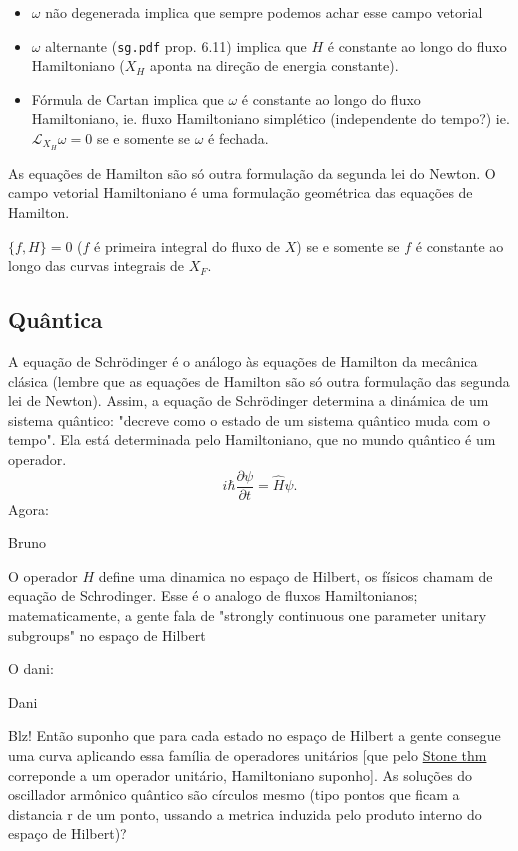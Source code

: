 \begin{itemize}
\item $\omega$ n\~ao degenerada implica que sempre podemos achar esse campo vetorial

\item  $\omega$ alternante (\texttt{sg.pdf} prop. 6.11) implica que $H$ \'e constante ao longo do fluxo Hamiltoniano ($X_H$ aponta na  dire\c c\~ao de energia constante).

\item F\'ormula de Cartan implica que $\omega$  \'e constante ao longo do fluxo Hamiltoniano, ie. fluxo Hamiltoniano simpl\'etico (independente do tempo?) ie. $\mathcal{L}_{X_H}\omega=0$ se e somente se $\omega$ \'e fechada.
\end{itemize}

As equa\c c\~oes de Hamilton s\~ao s\'o outra formula\c c\~ao da segunda lei do Newton. O campo vetorial Hamiltoniano \'e uma formula\c c\~ao geom\'etrica das equa\c c\~oes de Hamilton.

\begin{prop}
	$\{f,H\}=0$ ($f$ \'e primeira integral do fluxo de $X$) se e somente se $f$ \'e constante ao longo das curvas integrais de $X_F$.
\end{prop}

\subsection{Qu\^antica}

A equação de Schrödinger é o análogo às equações de Hamilton da mecânica clásica (lembre que as equações de Hamilton são só outra formulação das segunda lei de Newton). Assim, a equação de Schrödinger determina a dinámica de um sistema quântico: "decreve como o estado de um sistema quântico muda com o tempo". Ela está determinada pelo Hamiltoniano, que no mundo quântico é um operador.
 \[i\hbar \frac{\partial \psi}{\partial t}=\hat{H}\psi.\]
 Agora:
 	\begin{thing3}{Bruno}\leavevmode
 		
 	O operador $H$ define uma dinamica no espaço de Hilbert, os físicos chamam de equação de Schrodinger. Esse é o analogo de fluxos Hamiltonianos; matematicamente, a gente fala de "strongly continuous one parameter unitary subgroups" no espaço de Hilbert
\end{thing3}

 O dani:
 \begin{thing5}{Dani}\leavevmode
 	
		 Blz! Então suponho que para cada estado no espaço de Hilbert a gente consegue uma curva aplicando essa família de operadores unitários [que pelo \href{https://en.wikipedia.org/wiki/Stone%27s_theorem_on_one-parameter_unitary_groups}{Stone thm} correponde  a um operador unitário, Hamiltoniano suponho]. As soluções do oscillador armônico quântico são círculos mesmo (tipo pontos que ficam a distancia r de um ponto, ussando a metrica induzida pelo produto interno do espaço de Hilbert)?
 \end{thing5}

